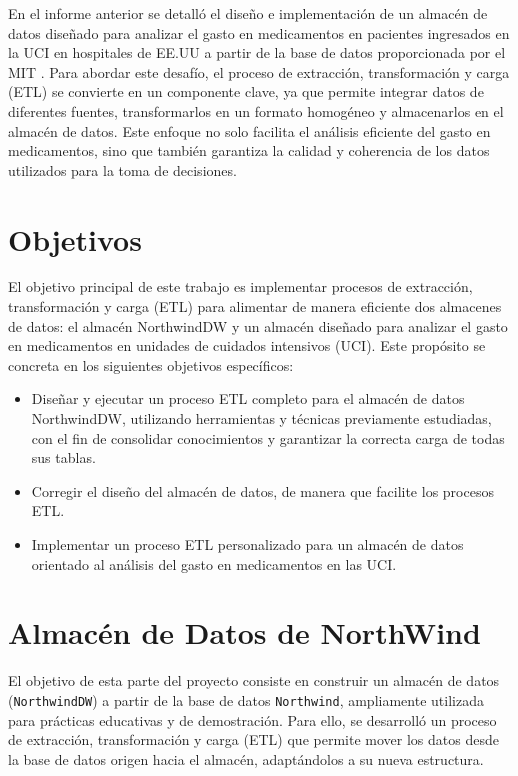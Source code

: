 \documentclass{article}
\begin{document}
	En el informe anterior se detalló el diseño e implementación de un almacén de datos diseñado para analizar el gasto en medicamentos en pacientes ingresados en la UCI en hospitales de EE.UU a partir de la base de datos proporcionada por el MIT \cite{eicu_crd}. Para abordar este desafío, el proceso de extracción, transformación y carga (ETL) se convierte en un componente clave, ya que permite integrar datos de diferentes fuentes, transformarlos en un formato homogéneo y almacenarlos en el almacén de datos. Este enfoque no solo facilita el análisis eficiente del gasto en medicamentos, sino que también garantiza la calidad y coherencia de los datos utilizados para la toma de decisiones.
	
	\section{Objetivos}
	\label{sec:objetivos}
	
	El objetivo principal de este trabajo es implementar procesos de extracción, transformación y carga (ETL) para alimentar de manera eficiente dos almacenes de datos: el almacén NorthwindDW y un almacén diseñado para analizar el gasto en medicamentos en unidades de cuidados intensivos (UCI). Este propósito se concreta en los siguientes objetivos específicos:
	
	\begin{itemize}
		\item Diseñar y ejecutar un proceso ETL completo para el almacén de datos NorthwindDW, utilizando herramientas y técnicas previamente estudiadas, con el fin de consolidar conocimientos y garantizar la correcta carga de todas sus tablas.
		\item Corregir el diseño del almacén de datos, de manera que facilite los procesos ETL.
		\item Implementar un proceso ETL personalizado para un almacén de datos orientado al análisis del gasto en medicamentos en las UCI.
		
	\end{itemize}
	
	\section{Almacén de Datos de NorthWind}
	
	El objetivo de esta parte del proyecto consiste en construir un almacén de datos (\texttt{NorthwindDW}) a partir de la base de datos \texttt{Northwind}, ampliamente utilizada para prácticas educativas y de demostración. Para ello, se desarrolló un proceso de extracción, transformación y carga (ETL) que permite mover los datos desde la base de datos origen hacia el almacén, adaptándolos a su nueva estructura.
	
\end{document}
